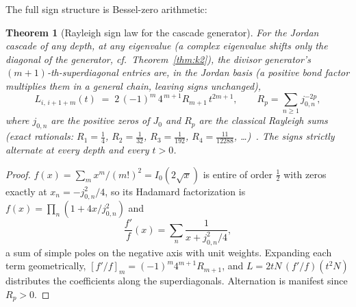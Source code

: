 ﻿\documentclass[11pt]{article}
\newtheorem{theorem}{Theorem}
\theoremstyle{remark}
\begin{document}
The full sign structure is Bessel-zero arithmetic:

\begin{theorem}[Rayleigh sign law for the cascade generator]
\label{thm:rayleigh}
For the Jordan cascade of any depth, at any eigenvalue (a complex
eigenvalue shifts only the diagonal of the generator, cf.\
Theorem~\ref{thm:k2}), the divisor generator's
$(m{+}1)$-th-superdiagonal entries are, in the Jordan basis (a positive
bond factor multiplies them in a general chain, leaving signs unchanged),
\[
L_{i,\,i+1+m}(t)\;=\;2\,(-1)^m\,4^{\,m+1}R_{m+1}\,t^{2m+1},
\qquad
R_p=\sum_{n\ge1} j_{0,n}^{-2p},
\]
where $j_{0,n}$ are the positive zeros of $J_0$ and $R_p$ are
the classical Rayleigh sums (exact rationals: $R_1=\tfrac14$,
$R_2=\tfrac1{32}$, $R_3=\tfrac1{192}$,
$R_4=\tfrac{11}{12288}$, \dots)~\cite{Watson}. The signs
strictly alternate at every depth and every $t>0$.
\end{theorem}

\begin{proof}
$f(x)=\sum_m x^m/(m!)^2=I_0(2\sqrt x)$ is entire of order
$\tfrac12$ with zeros exactly at $x_n=-j_{0,n}^2/4$, so its
Hadamard factorization is $f(x)=\prod_n(1+4x/j_{0,n}^2)$ and
\[
\frac{f'}{f}(x)=\sum_n\frac{1}{x+j_{0,n}^2/4},
\]
a sum of simple poles on the negative axis with unit weights.
Expanding each term geometrically,
$[f'/f]_m=(-1)^m4^{m+1}R_{m+1}$, and
$L=2tN\,(f'/f)(t^2N)$ distributes the coefficients along the
superdiagonals. Alternation is manifest since $R_p>0$.
\end{proof}
\end{document}

